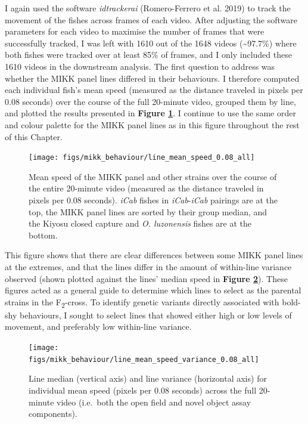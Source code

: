\documentclass[
]{book}
\begin{document}
I again used the software \emph{idtrackerai} (Romero-Ferrero et al. 2019) to track the movement of the fishes across frames of each video. After adjusting the software parameters for each video to maximise the number of frames that were successfully tracked, I was left with 1610 out of the 1648 videos (\textasciitilde97.7\%) where both fishes were tracked over at least 85\% of frames, and I only included these 1610 videos in the downstream analysis. The first question to address was whether the MIKK panel lines differed in their behaviours. I therefore computed each individual fish's mean speed (measured as the distance traveled in pixels per 0.08 seconds) over the course of the full 20-minute video, grouped them by line, and plotted the results presented in \textbf{Figure \ref{fig:mikk-mean-speed}}. I continue to use the same order and colour palette for the MIKK panel lines as in this figure throughout the rest of this Chapter.



\begin{figure}
\texttt{[image: figs/mikk\_behaviour/line\_mean\_speed\_0.08\_all]} \caption{Mean speed of the MIKK panel and other strains over the course of the entire 20-minute video (measured as the distance traveled in pixels per 0.08 seconds). \emph{\textcolor{iCab_424B4D}{iCab}} fishes in \emph{\textcolor{iCab_424B4D}{iCab}}-\emph{\textcolor{iCab_424B4D}{iCab}} pairings are at the top, the MIKK panel lines are sorted by their group median, and the Kiyosu closed capture and \emph{O. luzonensis} fishes are at the bottom.}\label{fig:mikk-mean-speed}
\end{figure}

This figure shows that there are clear differences between some MIKK panel lines at the extremes, and that the lines differ in the amount of within-line variance observed (shown plotted against the lines' median speed in \textbf{Figure \ref{fig:mikk-mean-speed-variance}}). These figures acted as a general guide to determine which lines to select as the parental strains in the F\textsubscript{2}-cross. To identify genetic variants directly associated with bold-shy behaviours, I sought to select lines that showed either high or low levels of movement, and preferably low within-line variance.



\begin{figure}
\texttt{[image: figs/mikk\_behaviour/line\_mean\_speed\_variance\_0.08\_all]} \caption{Line median (vertical axis) and line variance (horizontal axis) for individual mean speed (pixels per 0.08 seconds) across the full 20-minute video (i.e.~both the open field and novel object assay components).}\label{fig:mikk-mean-speed-variance}
\end{figure}
\end{document}
